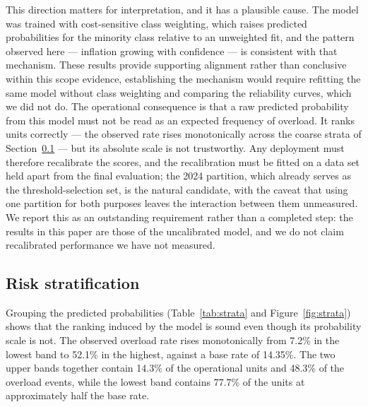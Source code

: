 \documentclass[sn-vancouver,Numbered]{sn-jnl}
\begin{document}
This direction matters for interpretation, and it has a plausible cause. The model was trained with cost-sensitive class weighting, which raises predicted probabilities for the minority class relative to an unweighted fit, and the pattern observed here --- inflation growing with confidence --- is consistent with that mechanism. These results provide supporting alignment rather than conclusive within this scope evidence, establishing the mechanism would require refitting the same model without class weighting and comparing the reliability curves, which we did not do. The operational consequence is that a raw predicted probability from this model must not be read as an expected frequency of overload. It ranks units correctly --- the observed rate rises monotonically across the coarse strata of Section~\ref{sec:strata} --- but its absolute scale is not trustworthy. Any deployment must therefore recalibrate the scores, and the recalibration must be fitted on a data set held apart from the final evaluation; the 2024 partition, which already serves as the threshold-selection set, is the natural candidate, with the caveat that using one partition for both purposes leaves the interaction between them unmeasured. We report this as an outstanding requirement rather than a completed step: the results in this paper are those of the uncalibrated model, and we do not claim recalibrated performance we have not measured.

\subsection{Risk stratification}\label{sec:strata}

Grouping the predicted probabilities (Table~\ref{tab:strata} and Figure~\ref{fig:strata}) shows that the ranking induced by the model is sound even though its probability scale is not. The observed overload rate rises monotonically from 7.2\% in the lowest band to 52.1\% in the highest, against a base rate of 14.35\%. The two upper bands together contain 14.3\% of the operational units and 48.3\% of the overload events, while the lowest band contains 77.7\% of the units at approximately half the base rate.
\end{document}
